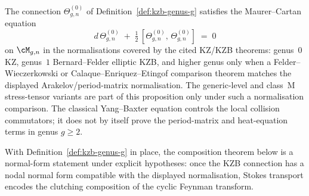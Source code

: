 \begin{proposition}
\label{prop:kzb-flatness}

The connection $\Theta^{(0)}_{g,n}$ of
Definition~\ref{def:kzb-genus-g} satisfies the Maurer--Cartan equation
\[
 d\,\Theta^{(0)}_{g,n}
 \;+\;
 \tfrac{1}{2}\,[\Theta^{(0)}_{g,n},\,\Theta^{(0)}_{g,n}]
 \;=\;
 0
\]
on $\cM_{g,n}$ in the normalisations covered by the cited KZ/KZB
theorems: genus~$0$ KZ, genus~$1$ Bernard--Felder elliptic KZB, and
higher genus only when a Felder--Wieczerkowski or
Calaque--Enriquez--Etingof comparison theorem matches the displayed
Arakelov/period-matrix normalisation. The generic-level and class~M
stress-tensor variants are part of this proposition only under such a
normalisation comparison. The classical Yang--Baxter equation controls
the local collision commutators; it does not by itself prove the
period-matrix and heat-equation terms in genus $g\ge2$.
\end{proposition}

With Definition~\ref{def:kzb-genus-g} in place, the composition
theorem below is a normal-form statement under explicit hypotheses:
once the KZB
connection has a nodal normal form compatible with the displayed
normalisation, Stokes transport encodes the clutching composition of
the cyclic Feynman transform.

